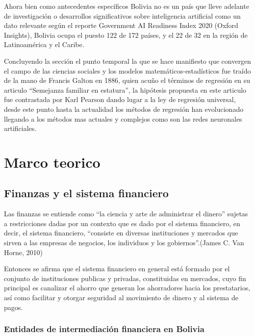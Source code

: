 \documentclass[
  12pt,
]{article}
\begin{document}
Ahora bien como antecedentes específicos Bolivia no es un país que lleve
adelante de investigación o desarrollos significativos sobre
inteligencia artificial como un dato relevante según el reporte
Government AI Readiness Index 2020 (Oxford Insights), Bolivia ocupa el
puesto 122 de 172 países, y el 22 de 32 en la región de Latinoamérica y
el Caribe.

Concluyendo la sección el punto temporal la que se hace manifiesto que
convergen el campo de las ciencias sociales y los modelos
matemáticos-estadísticos fue traído de la mano de Francis Galton en
1886, quien acuño el términos de regresión en su articulo ``Semejanza
familiar en estatura'', la hipótesis propuesta en este articulo fue
contrastada por Karl Pearson dando lugar a la ley de regresión
universal, desde este punto hasta la actualidad los métodos de regresión
han evolucionado llegando a los métodos mas actuales y complejos como
son las redes neuronales artificiales.

\newpage

\hypertarget{marco-teorico}{%
\section{Marco teorico}\label{marco-teorico}}

\hypertarget{finanzas-y-el-sistema-financiero}{%
\subsection{Finanzas y el sistema
financiero}\label{finanzas-y-el-sistema-financiero}}

Las finanzas se entiende como ``la ciencia y arte de administrar el
dinero'' sujetas a restricciones dadas por un contexto que es dado por
el sistema financiero, en decir, el sistema financiero, ``consiste en
diversas instituciones y mercados que sirven a las empresas de negocios,
los individuos y los gobiernos''.(James C. Van Horne, 2010)

Entonces se afirma que el sistema financiero en general está formado por
el conjunto de instituciones publicas y privadas, constituidas en
mercados, cuyo fin principal es canalizar el ahorro que generan los
ahorradores hacia los prestatarios, así como facilitar y otorgar
seguridad al movimiento de dinero y al sistema de pagos.

\hypertarget{entidades-de-intermediaciuxf3n-financiera-en-bolivia}{%
\subsubsection{Entidades de intermediación financiera en
Bolivia}\label{entidades-de-intermediaciuxf3n-financiera-en-bolivia}}
\end{document}
